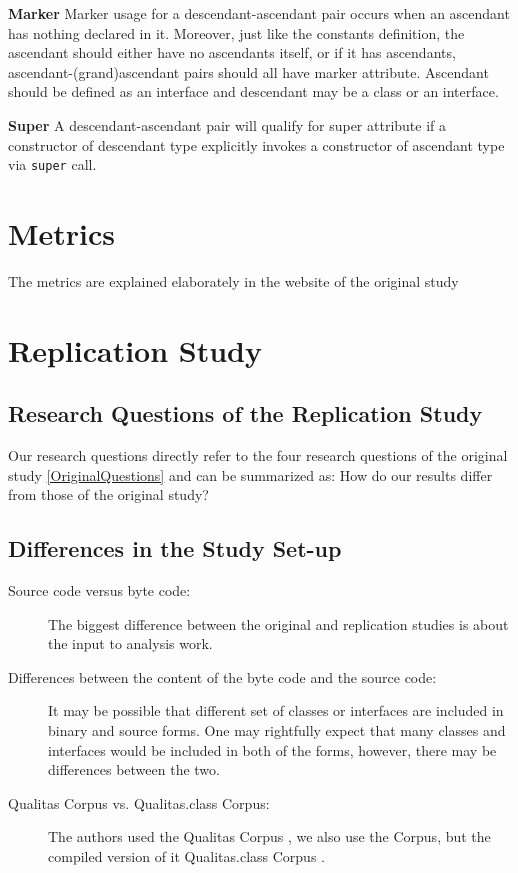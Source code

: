 \documentclass [11pt, parskip=full] {article}
\begin{document}
\begin{description}
\item{\bf{Marker}}
Marker usage for a descendant-ascendant pair occurs when an ascendant has nothing declared in it. Moreover, just like the constants definition, the ascendant should either have no ascendants itself, or if it has ascendants, ascendant-(grand)ascendant pairs should all have marker attribute. Ascendant should be defined as an interface and descendant may be a class or an interface. 

\item{\bf{Super}}
A descendant-ascendant pair will qualify for super attribute if a constructor of descendant type explicitly invokes a constructor of ascendant type via \texttt{super} call.

\end{description}

\section{Metrics}
The metrics are explained elaborately in the website of the original study \cite{InheritanceUseWeb} 

\section{Replication Study}

\subsection{Research Questions of the Replication Study}

  Our research questions directly refer to the four research questions of the original study \ref{OriginalQuestions} and can be summarized as: How do our results differ from those of the original study? 

\subsection{Differences in the Study Set-up}
\begin{description}

\item[Source code versus byte code:] The biggest difference between the original and replication studies is about the input to analysis work. 

\item[Differences between the content of the byte code and the source code:] It may be possible that different set of classes or interfaces are included in binary and source forms. One may rightfully expect that many classes and interfaces would be included in both of the forms, however, there may be differences between the two.

\item[Qualitas Corpus vs. Qualitas.class Corpus:] The authors used the Qualitas Corpus \cite{QualitasCorpus:APSEC:2010}, we also use the Corpus, but the compiled version of it Qualitas.class Corpus \cite{qualitas.class}.

\end{description}
\end{document}
